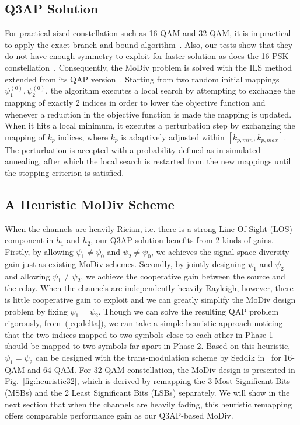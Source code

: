 \documentclass[journal,draftcls,onecolumn,12pt,twoside]{IEEEtran}
\begin{document}
\subsection{Q3AP Solution}
For practical-sized constellation such as 16-QAM and 32-QAM, it is impractical
to apply the exact branch-and-bound algorithm~\cite{hahn2008quadratic}. Also,
our tests show that they do not have enough symmetry to exploit for faster
solution as does the 16-PSK constellation~\cite{mittelmann2015solving}.
Consequently, the MoDiv problem is solved with the ILS
method~\cite{hahn2008quadratic} extended from its QAP
version~\cite{stutzle2006iterated}. Starting from two random initial mappings
$\psi_1^{(0)}, \psi_2^{(0)}$, the algorithm executes a local search by
attempting to exchange the mapping of exactly 2 indices in order to lower the
objective function and whenever a reduction in the objective function is made
the mapping is updated. When it hits a local minimum, it executes a perturbation
step by exchanging the mapping of $k_p$ indices, where $k_p$ is adaptively
adjusted within $[k_{p,min}, k_{p,max}]$. The perturbation is accepted with a
probability defined as in simulated annealing, after which the local search is
restarted from the new mappings until the stopping criterion is satisfied.

\subsection{A Heuristic MoDiv Scheme}
\label{sec:heuristic}
When the channels are heavily Rician, i.e. there is a strong Line Of Sight (LOS)
component in $h_1$ and $h_2$,  our Q3AP solution benefits from 2 kinds of gains.
Firstly, by allowing $\psi_1\not=\psi_0$ and $\psi_2\not=\psi_0$, we achieves
the signal space diversity gain just as existing MoDiv schemes. Secondly, by
jointly designing $\psi_1$ and $\psi_2$ and allowing $\psi_1\not=\psi_2$, we
achieve the cooperative gain between the source and the relay. When the channels
are independently heavily Rayleigh, however, there is little cooperative gain to
exploit and we can greatly simplify the MoDiv design problem by fixing
$\psi_1=\psi_2$. Though we can solve the resulting QAP problem rigorously, 
from~(\ref{eq:delta}), we can take a simple heuristic approach noticing that the
two indices mapped to two symbols close to each other in Phase 1 should be
mapped to two symbols far apart in Phase 2. Based on this
heuristic, $\psi_1=\psi_2$ can be designed with the trans-modulation scheme by
Seddik in~\cite{seddik2008trans} for 16-QAM and 64-QAM. For 32-QAM
constellation, the MoDiv design is presented in Fig.~\ref{fig:heuristic32}, which is
derived by remapping the 3 Most Significant Bits (MSBs) and the 2 Least
Significant Bits (LSBs) separately. We will show in the next section that when
the channels are heavily fading, this heuristic remapping offers comparable
performance gain as our Q3AP-based MoDiv.
\end{document}
